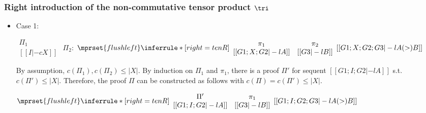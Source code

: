 \subsubsection{Right introduction of the non-commutative tensor product $\tri$}
\begin{itemize}
\item Case 1:
      \begin{center}
        \scriptsize
        \begin{math}
          \begin{array}{c}
            \Pi_1 \\
            {[[I |-c X]]}
          \end{array}
        \end{math}
        \qquad\qquad
        $\Pi_2$:
        \begin{math}
          $$\mprset{flushleft}
          \inferrule* [right={\tiny tenR}] {
            {
              \begin{array}{cc}
                \pi_1 & \pi_2 \\
                {[[G1; X; G2 |-l A]]} & {[[G3 |-l B]]}
              \end{array}
            }
          }{[[G1; X; G2; G3 |-l A (>) B]]}
        \end{math}
      \end{center}
      By assumption, $c(\Pi_1),c(\Pi_2)\leq |X|$. By induction on $\Pi_1$
      and $\pi_1$, there is a proof $\Pi'$ for sequent
      $[[G1; I; G2 |-l A]]$ s.t. $c(\Pi') \leq |X|$. Therefore, the proof
      $\Pi$ can be constructed as follows with $c(\Pi) = c(\Pi') \leq |X|$.
      \begin{center}
        \scriptsize
        \begin{math}
          $$\mprset{flushleft}
          \inferrule* [right={\tiny tenR}] {
            {
              \begin{array}{cc}
                \Pi' & \pi_1 \\
                {[[G1; I; G2 |-l A]]} & {[[G3 |-l B]]}
              \end{array}
            }
          }{[[G1; I; G2; G3 |-l A (>) B]]}
        \end{math}
      \end{center}


\end{itemize}
